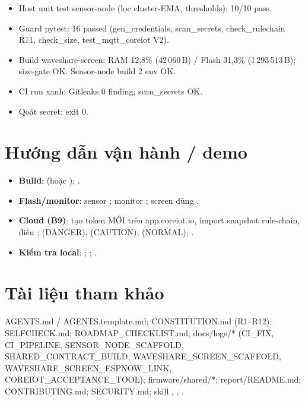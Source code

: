 \begin{itemize}
\item Host unit test sensor-node (lọc cluster-EMA, thresholds): 10/10 pass.
\item Guard pytest: 16 passed (gen\_credentials, scan\_secrets, check\_rulechain R11,
  check\_size, test\_mqtt\_coreiot V2).
\item Build waveshare-screen: RAM 12,8\% (42\,060\,B) / Flash 31,3\% (1\,293\,513\,B);
  size-gate OK. Sensor-node build 2 env OK.
\item CI run  xanh; Gitleaks 0 finding; scan\_secrets OK.
\item Qoát secret:  exit 0.
\end{itemize}

\section{Hướng dẫn vận hành / demo}
\label{sec:sys-ops}

\begin{itemize}
\item \textbf{Build}: 
  (hoặc ); .
\item \textbf{Flash/monitor}: sensor ; monitor ; screen dùng
  .
\item \textbf{Cloud (B9)}: tạo token MỚI trên app.coreiot.io, import snapshot rule-chain,
  điền ;  (DANGER),  (CAUTION),  (NORMAL); .
\item \textbf{Kiểm tra local}: ;
  ; .
\end{itemize}

\section{Tài liệu tham khảo}
\label{sec:sys-refs}

AGENTS.md / AGENTS.template.md; CONSTITUTION.md (R1--R12); SELFCHECK.md;
ROADMAP\_CHECKLIST.md; docs/logs/* (CI\_FIX, CI\_PIPELINE, SENSOR\_NODE\_SCAFFOLD,
SHARED\_CONTRACT\_BUILD, WAVESHARE\_SCREEN\_SCAFFOLD, WAVESHARE\_SCREEN\_ESPNOW\_LINK,
COREIOT\_ACCEPTANCE\_TOOL); firmware/shared/*; report/README.md; CONTRIBUTING.md;
SECURITY.md; skill , ,
.